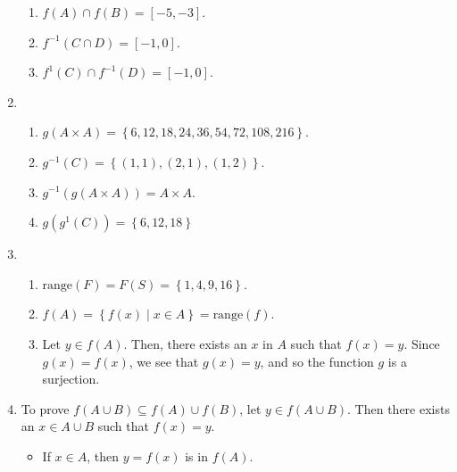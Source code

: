 \begin{enumerate}
\begin{multicols}{2}
\begin{enumerate}
\item $f \left( A \right) \cap f \left( B \right) = \left[ -5, -3 \right]$.

\item $f^{-1} \left( C \cap D \right) = \left[ -1, 0 \right]$.

\item $f^{1} \left( C \right) \cap f^{-1} \left( D \right) = \left[ -1, 0 \right]$.
\end{enumerate}
\end{multicols}

\item \begin{enumerate}
\item $g \left( A \times A \right) = \left\{6, 12, 18, 24, 36, 54, 72, 108, 216 \right\}$.

\item $g^{-1} \left( C \right) = \left\{ \left( 1, 1 \right), \left( 2, 1 \right), 
\left( 1, 2 \right) \right\}$.

\item $g^{-1} \left( g \left( A \times A \right) \right) = A \times A$.

\item $g \left( g^{1} \left( C \right) \right) = \left\{ 6, 12, 18 \right\}$
\end{enumerate}

\item \begin{enumerate}
\item $\text{range} \left( F \right) = F \left( S \right) = \left\{1, 4, 9, 16 \right\}$.

\item $f \left( A \right) = \left\{ f \left( x \right) \mid x \in A \right\} = \text{range} \left( f \right)$.

\item Let $y \in f \left( A \right)$.  Then, there exists an $x$ in $A$ such that 
$f \left( x \right) = y$.  Since $g \left( x \right) = f \left( x \right)$, we see that 
$g \left( x \right) = y$, and so the function $g$ is a surjection.
\end{enumerate}

\item To prove $f \left( A \cup B \right) \subseteq f \left( A \right) \cup f \left( B \right)$, let $y \in f \left( A \cup B \right)$.  Then there exists an $x \in A \cup B$ such that 
$f \left( x \right) = y$.  

\begin{itemize}
\item If $x \in A$, then $y = f \left( x \right)$ is in $f \left( A \right)$.


\end{itemize}
\end{enumerate}
